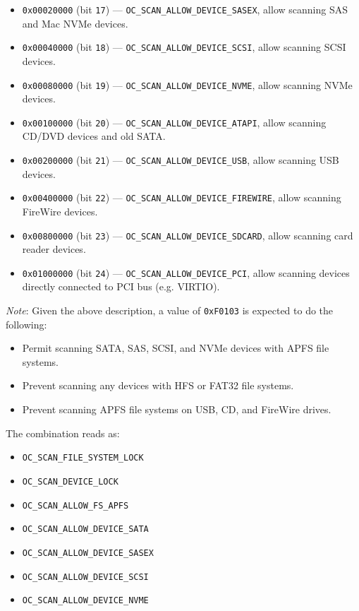 \documentclass[]{article}
\providecommand{\tightlist}{%
  \setlength{\itemsep}{0pt}\setlength{\parskip}{0pt}}
\begin{document}
\begin{enumerate}
\begin{itemize}
    \item \texttt{0x00020000} (bit \texttt{17}) --- \texttt{OC\_SCAN\_ALLOW\_DEVICE\_SASEX}, allow
    scanning SAS and Mac NVMe devices.
    \item \texttt{0x00040000} (bit \texttt{18}) --- \texttt{OC\_SCAN\_ALLOW\_DEVICE\_SCSI}, allow
    scanning SCSI devices.
    \item \texttt{0x00080000} (bit \texttt{19}) --- \texttt{OC\_SCAN\_ALLOW\_DEVICE\_NVME}, allow
    scanning NVMe devices.
    \item \texttt{0x00100000} (bit \texttt{20}) --- \texttt{OC\_SCAN\_ALLOW\_DEVICE\_ATAPI}, allow
    scanning CD/DVD devices and old SATA.
    \item \texttt{0x00200000} (bit \texttt{21}) --- \texttt{OC\_SCAN\_ALLOW\_DEVICE\_USB}, allow
    scanning USB devices.
    \item \texttt{0x00400000} (bit \texttt{22}) --- \texttt{OC\_SCAN\_ALLOW\_DEVICE\_FIREWIRE}, allow
    scanning FireWire devices.
    \item \texttt{0x00800000} (bit \texttt{23}) --- \texttt{OC\_SCAN\_ALLOW\_DEVICE\_SDCARD}, allow
    scanning card reader devices.
    \item \texttt{0x01000000} (bit \texttt{24}) --- \texttt{OC\_SCAN\_ALLOW\_DEVICE\_PCI}, allow
    scanning devices directly connected to PCI bus (e.g. VIRTIO).
  \end{itemize}

  \emph{Note}: Given the above description, a value of \texttt{0xF0103} is expected to do the following:

  \begin{itemize}
  \tightlist
  \item Permit scanning SATA, SAS, SCSI, and NVMe devices with APFS file systems.
  \item Prevent scanning any devices with HFS or FAT32 file systems.
  \item Prevent scanning APFS file systems on USB, CD, and FireWire drives.
  \end{itemize}

  The combination reads as:
  \begin{itemize}
  \tightlist
  \item \texttt{OC\_SCAN\_FILE\_SYSTEM\_LOCK}
  \item \texttt{OC\_SCAN\_DEVICE\_LOCK}
  \item \texttt{OC\_SCAN\_ALLOW\_FS\_APFS}
  \item \texttt{OC\_SCAN\_ALLOW\_DEVICE\_SATA}
  \item \texttt{OC\_SCAN\_ALLOW\_DEVICE\_SASEX}
  \item \texttt{OC\_SCAN\_ALLOW\_DEVICE\_SCSI}
  \item \texttt{OC\_SCAN\_ALLOW\_DEVICE\_NVME}
  \end{itemize}


\end{enumerate}
\end{document}
